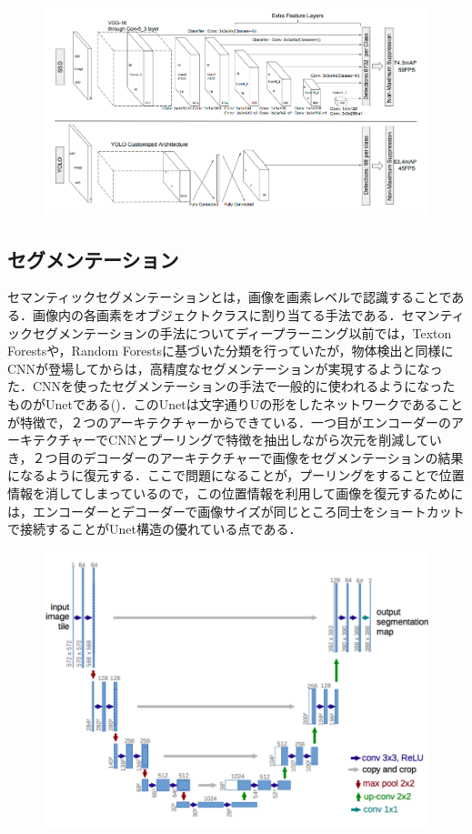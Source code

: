 \begin{figure}[h]
\centering
\includegraphics[width=0.7\linewidth]{fig/yolo_ssd.png}
\caption{}
\label{fig:YOLO}
\end{figure}

\subsection*{セグメンテーション}
セマンティックセグメンテーションとは，画像を画素レベルで認識することである．画像内の各画素をオブジェクトクラスに割り当てる手法である．セマンティックセグメンテーションの手法についてディープラーニング以前では，Texton Forestsや，Random Forestsに基づいた分類を行っていたが，物体検出と同様にCNNが登場してからは，高精度なセグメンテーションが実現するようになった．CNNを使ったセグメンテーションの手法で一般的に使われるようになったものがUnetである()．このUnetは文字通りUの形をしたネットワークであることが特徴で，２つのアーキテクチャーからできている．一つ目がエンコーダーのアーキテクチャーでCNNとプーリングで特徴を抽出しながら次元を削減していき，２つ目のデコーダーのアーキテクチャーで画像をセグメンテーションの結果になるように復元する．ここで問題になることが，プーリングをすることで位置情報を消してしまっているので，この位置情報を利用して画像を復元するためには，エンコーダーとデコーダーで画像サイズが同じところ同士をショートカットで接続することがUnet構造の優れている点である．

\begin{figure}[h]
\centering
\includegraphics[width=0.7\linewidth]{fig/unet.png}
\caption{}
\label{fig:Unet}
\end{figure}

